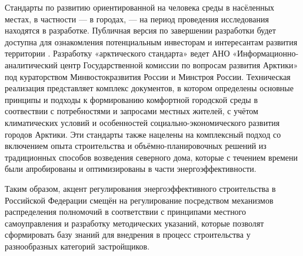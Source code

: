 Стандарты по развитию ориентированной на человека среды в насёленных местах, в частности --- в городах, --- на период проведения исследования находятся в разработке.
Публичная версия по завершении разработки будет доступна для ознакомления потенциальным инвесторам и интересантам развития территории \cite{law_RU_govAggregatorArcticStandart}.
Разработку «арктического стандарта» ведет АНО «Информационно-аналитический центр
Государственной комиссии по вопросам развития Арктики» под кураторством Минвостокразвития России и Минстроя России.
Техническая реализация представляет комплекс документов, в котором определены основные принципы и подходы к формированию
комфортной городской среды в соотвествии с потребностями и запросами местных жителей, с учётом климатических условий и особенностей социально-экономического развития городов Арктики.
Эти стандарты также нацелены на комплексный подход со включением опыта строительства и объёмно-планировочных решений из традиционных способов возведения северного дома,
которые с течением времени были апробированы и оптимизированы в части энергоэффективности.

Таким образом, акцент регулирования энергоэффективного строительства в Российской Федерации смещён на регулирование посредством механизмов распределения полномочий в соответствии с принципами
местного самоуправления и разработку методических указаний, которые позволят сформировать базу знаний для внедрения в процесс строительства у разнообразных категорий застройщиков.





